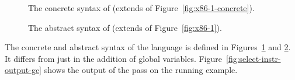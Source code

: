 \documentclass[7x10,nocrop]{TimesAPriori_MIT}%
\newcommand{\gray}[1]{{\color{gray} #1}}
\begin{document}
\begin{figure}[tp]
\fbox{
\begin{minipage}{0.96\textwidth}
\[
\begin{array}{lcl}
  \Arg &::=& \gray{ \key{\$}\Int \MID \key{\%}\Reg \MID \Int\key{(}\key{\%}\Reg\key{)} \MID \key{\%}\itm{bytereg} } \MID \Var \key{(\%rip)} \\
\LangXGlobalM{} &::= & \gray{ \key{.globl main} }\\
      &    & \gray{ \key{main:} \; \Instr^{*} }
\end{array}
\]
\end{minipage}
}
\caption{The concrete syntax of \LangXGlobal{}  (extends \LangXIf{} of Figure~\ref{fig:x86-1-concrete}).}
\label{fig:x86-2-concrete}
\end{figure}

\begin{figure}[tp]
\fbox{
  \begin{minipage}{0.96\textwidth}
    \small
\[
\begin{array}{lcl}
  \Arg &::=&  \gray{  \INT{\Int} \MID \REG{\Reg} \MID \DEREF{\Reg}{\Int}
   \MID \BYTEREG{\Reg}} \\
   &\MID& \GLOBAL{\Var} \\
\LangXGlobalM{} &::= & \gray{ \XPROGRAM{\itm{info}}{\LP\LP\itm{label} \,\key{.}\, \Block \RP\ldots\RP} }
\end{array}
\]
\end{minipage}
}
\caption{The abstract syntax of \LangXGlobal{} (extends \LangXIf{} of Figure~\ref{fig:x86-1}).}
\label{fig:x86-2}
\end{figure}

The concrete and abstract syntax of the \LangXGlobal{} language is
defined in Figures~\ref{fig:x86-2-concrete} and \ref{fig:x86-2}.  It
differs from \LangXIf{} just in the addition of global variables.
%
Figure~\ref{fig:select-instr-output-gc} shows the output of the
 pass on the running example.
\end{document}
